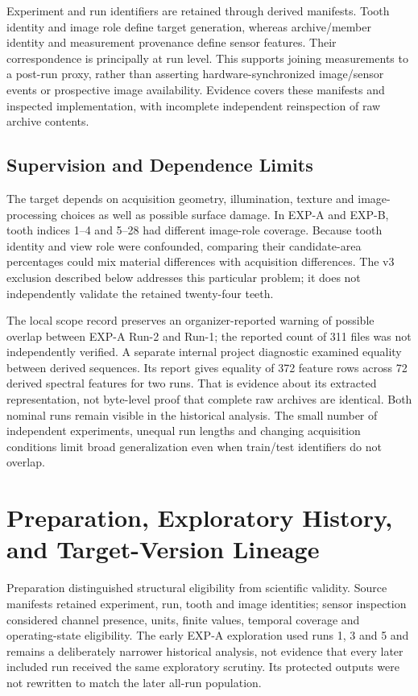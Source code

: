 Experiment and run identifiers are retained through derived manifests. Tooth identity
and image role define target generation, whereas archive/member identity and measurement
provenance define sensor features. Their correspondence is principally at run level.
This supports joining measurements to a post-run proxy, rather than asserting
hardware-synchronized image/sensor events or prospective image availability. Evidence
covers these manifests and inspected implementation, with incomplete independent
reinspection of raw archive contents.

\subsection{Supervision and Dependence Limits}
The target depends on acquisition geometry, illumination, texture and image-processing
choices as well as possible surface damage. In EXP-A and EXP-B, tooth indices 1--4 and
5--28 had different image-role coverage. Because tooth identity and view role were
confounded, comparing their candidate-area percentages could mix material differences
with acquisition differences. The v3 exclusion described below addresses this particular
problem; it does not independently validate the retained twenty-four teeth.

The local scope record preserves an organizer-reported warning of possible overlap
between EXP-A Run-2 and Run-1; the reported count of 311 files was not independently
verified.
A separate internal project diagnostic examined equality between derived sequences.
Its report gives equality of 372 feature rows across 72 derived spectral features for
two runs. That is evidence about its extracted representation, not byte-level proof
that complete raw archives are identical. Both nominal runs remain visible in the historical
analysis. The small number of independent experiments, unequal run lengths and changing
acquisition conditions limit broad generalization even when train/test identifiers do
not overlap.

\section{Preparation, Exploratory History, and Target-Version Lineage}
Preparation distinguished structural eligibility from scientific validity. Source
manifests retained experiment, run, tooth and image identities; sensor inspection
considered channel presence, units, finite values, temporal coverage and operating-state
eligibility. The early EXP-A exploration used runs 1, 3 and 5 and remains a deliberately
narrower historical analysis, not evidence that every later included run received the
same exploratory scrutiny. Its protected outputs were not rewritten to match the later
all-run population.

